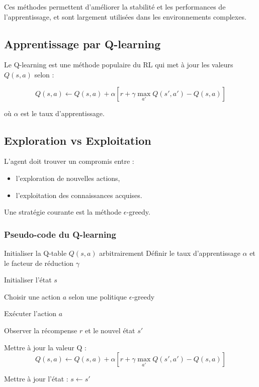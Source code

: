 \documentclass[12pt,a4paper]{report}
\begin{document}
Ces méthodes permettent d’améliorer la stabilité et les performances de l’apprentissage, et sont largement utilisées dans les environnements complexes.

\subsection{Apprentissage par Q-learning}

Le Q-learning est une méthode populaire du RL qui met à jour les valeurs $Q(s,a)$ selon :

\begin{equation}
Q(s,a) \leftarrow Q(s,a) + \alpha \left[r + \gamma \max_{a'} Q(s',a') - Q(s,a)\right]
\end{equation}

où $\alpha$ est le taux d’apprentissage.

\subsection{Exploration vs Exploitation}

L’agent doit trouver un compromis entre :
\begin{itemize}
    \item l’exploration de nouvelles actions,
    \item l’exploitation des connaissances acquises.
\end{itemize}

Une stratégie courante est la méthode $\epsilon$-greedy.

\subsubsection{Pseudo-code du Q-learning}

\begin{algorithm}[H]
\caption{Q-learning}
\begin{algorithmic}[1]

\STATE Initialiser la Q-table $Q(s,a)$ arbitrairement
\STATE Définir le taux d’apprentissage $\alpha$ et le facteur de réduction $\gamma$

    \STATE Initialiser l’état $s$
    
    
        \STATE Choisir une action $a$ selon une politique $\epsilon$-greedy
        
        \STATE Exécuter l’action $a$
        
        \STATE Observer la récompense $r$ et le nouvel état $s'$
        
        \STATE Mettre à jour la valeur Q :
        \[
        Q(s,a) \leftarrow Q(s,a) + \alpha \left[r + \gamma \max_{a'} Q(s',a') - Q(s,a)\right]
        \]
        
        \STATE Mettre à jour l’état : $s \leftarrow s'$
        
    \ENDFOR
\ENDFOR

\end{algorithmic}
\end{algorithm}
\end{document}
